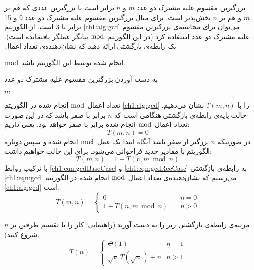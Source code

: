  بزرگترین مقسوم ‌علیه مشترک دو عدد {$m$} و {$n$} برابر است با بزرگترین عددی که هم بر {$m$} و هم بر {$n$} بخش‌پذیر است. برای مثال بزرگترین مقسوم ‌علیه مشترک دو عدد 9 و 15 برابر با 3 است. از الگوریتم {\ref{ch1:alg:gcd}} می‌توان برای محاسبه‌ی بزرگترین مقسوم ‌علیه مشترک دو عدد استفاده کرد (در این الگوریتم {$\bmod$} بیانگر عملگر باقیمانده است). یک رابطه‌ی بازگشتی‌ ارائه دهید که نشان‌دهنده‌ی تعداد اعمال {{$\bmod$ انجام شده توسط این الگوریتم باشد.

\begin{algorithm}
\caption{به دست آوردن بزرگترین مقسوم علیه مشترک دو عدد}\label{ch1:alg:gcd}
\begin{latin}
\begin{algorithmic}[1]
				\State {}
		\EndIf
			\State \Return $m$
		\Else
			\State \Return {}
		\EndIf
\EndFunction
\end{algorithmic}
\end{latin}
\end{algorithm}


تعداد اعمال {$\bmod$} انجام شده در الگوریتم {\ref{ch1:alg:gcd}} را با {$T(m,n)$} نشان می‌دهیم. حالت پایه‌‌ی رابطه‌‌ی بازگشتی هنگامی است که {$n$} برابر با صفر باشد که در این صورت تعداد اعمال {$\bmod$} انجام شده برابر با صفر خواهد بود. یعنی داریم:
\begin{equation}
T(m,n)=0\label{ch1:eqn:gcdBaseCase}
\end{equation}
در صورتیکه {$n$} بزرگتر از صفر باشد آنگاه ابتدا یک عمل {$\bmod$} انجام شده و سپس دوباره الگوریتم با مقادیر جدید فراخوانی می‌شود. برای این حالت خواهیم داشت:
\begin{equation}
T(m,n)=1+T(n, m \bmod n)\label{ch1:eqn:gcdRecCase}
\end{equation}
با ترکیب روابط {\eqref{ch1:eqn:gcdBaseCase}} و {\eqref{ch1:eqn:gcdRecCase}} به رابطه‌ی بازگشتی {\eqref{ch1:eqn:gcd}} می‌رسیم که نشان‌دهنده‌ی تعداد اعمال {$\bmod$} انجام شده در الگوریتم {\ref{ch1:alg:gcd}} است.
\begin{equation}
T(m,n) =
\begin{cases}
0 & \quad n=0\\
1+T(n,m\bmod n) & \quad n>0
\end{cases}\label{ch1:eqn:gcd}
\end{equation}

 مرتبه‌ی رابطه‌ی بازگشتی زیر را به دست آورید (راهنمایی: کار را با تقسیم طرفین بر {$n$} شروع کنید).
\begin{displaymath}
T(n)=
\begin{cases}
\Theta (1) & n=1\\
\sqrt{n}\,T\left(\sqrt{n}\,\right)+n & n>1
\end{cases}
\end{displaymath}

}}
